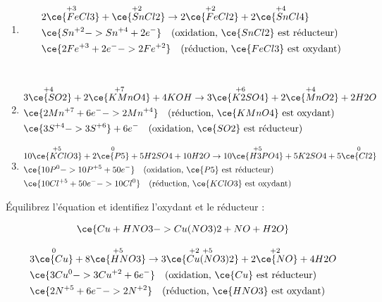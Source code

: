 \documentclass[
  11pt,
  a4paper,
  openany]{book}
\providecommand{\tightlist}{%
  \setlength{\itemsep}{0pt}\setlength{\parskip}{0pt}}
\begin{document}
\begin{Answer}

\begin{enumerate}
\def\labelenumi{\alph{enumi}.}
\tightlist
\item
  \[
  \begin{split}
  & 2 \overset{+3\ }{\ce{FeCl3}} + \overset{+2\ }{\ce{SnCl2}} \rightarrow 2 \overset{+2\ }{\ce{FeCl2}} + 2 \overset{+4\ }{\ce{SnCl4}} \\
  & \ce{ Sn^{+2} -> Sn^{+4} + 2 e^-} \quad \text{(oxidation, $\ce{SnCl2}$ est réducteur)} \\
  & \ce{ 2 Fe^{+3} + 2 e^- -> 2 Fe^{+2}} \quad \text{(réduction, $\ce{FeCl3}$ est oxydant)}
  \end{split}
  \]\\
\item
  \[
  \begin{split}
  & 3 \overset{+4\ }{\ce{SO2}} + 2 \overset{+7}{\ce{KMnO4}} + 4 KOH \rightarrow 3 \overset{+6}{\ce{K2SO4}} + 2 \overset{+4\ }{\ce{MnO2}} + 2 H2O \\
  & \ce{ 2 Mn^{+7} + 6e^- -> 2 Mn^{+4}} \quad \text{(réduction, $\ce{KMnO4}$ est oxydant)} \\
  & \ce{ 3 S^{+4} -> 3 S^{+6}} + 6e^- \quad \text{(oxidation, $\ce{SO2}$ est réducteur)}
  \end{split}
  \]
\item
  \[
  \begin{split}
  & 10 \overset{+5}{\ce{KClO3}} + 2 \overset{0}{\ce{P5}} + 5 H2SO4 + 10 H2O \rightarrow 10 \overset{+5}{\ce{H3PO4}} + 5 K2SO4 + 5 \overset{0}{\ce{Cl2}} \\
  & \ce{ 10 P^{0} -> 10 P^{+5} + 50 e^-} \quad \text{(oxidation, $\ce{P5}$ est réducteur)} \\
  & \ce{ 10 Cl^{+5} + 50 e^- -> 10 Cl^{0}} \quad \text{(réduction, $\ce{KClO3}$ est oxydant)}
  \end{split}
  \]
\end{enumerate}

\end{Answer}

\begin{Exercise}
Équilibrez l'équation et identifiez l'oxydant et le réducteur :

\[
\ce{ Cu + HNO3 -> Cu(NO3)2 + NO + H2O}
\]

\end{Exercise}

\begin{Answer}
\[
\begin{split}
& 3 \overset{0}{\ce{Cu}} + 8 \overset{+5}{\ce{HNO3}} \rightarrow 3 \overset{+2\ +5\ }{\ce{Cu(NO3)2}} + 2 \overset{+2\ }{\ce{NO}} + 4 H2O \\
& \ce{ 3 Cu^{0} -> 3 Cu^{+2} + 6 e^-} \quad \text{(oxidation, $\ce{Cu}$ est réducteur)} \\
& \ce{ 2 N^{+5} + 6 e^- -> 2 N^{+2}} \quad \text{(réduction, $\ce{HNO3}$ est oxydant)}
\end{split}
\]

\end{Answer}
\end{document}
